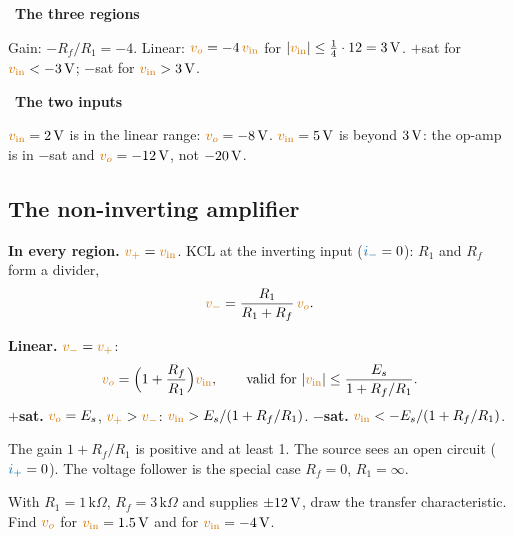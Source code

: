 \documentclass[11pt,a4paper]{article}
\newcommand{\Icol}[1]{\textcolor{ccur}{#1}}
\newcommand{\Vcol}[1]{\textcolor{cvolt}{#1}}
\newif\ifsolfirst
\newcommand{\solstep}[2]{\par\ifsolfirst\global\solfirstfalse\else\bigskip\needspace{5\baselineskip}\fi
  \noindent{\color{cpow}\bfseries Step #1.}\ {\bfseries #2}\par\nobreak\smallskip}
\newcommand{\kohm}{\,\mathrm{k}\Omega}
\newcommand{\vin}{\Vcol{v_{\mathrm{in}}}}
\newcommand{\vo}{\Vcol{v_o}}
\newcommand{\vp}{\Vcol{v_+}}
\newcommand{\vm}{\Vcol{v_-}}
\newcommand{\ip}{\Icol{i_+}}
\newcommand{\im}{\Icol{i_-}}
\newcommand{\Es}{E_s}
\newcommand{\noninvAmp}[3]{%
  \node[oa] (A) at (0,0) {};
  \draw (A.-) -- ++(-1.6,0) coordinate (n) to[R, l_=#1] ++(0,-2.5) node[ground] {};
  \draw (A.+) -- ++(-0.6,0) coordinate (s) to[american voltage source, l=#3] ($(s)+(0,-1.6)$) node[ground] {};
  \draw (n) -- ++(0,1.3) coordinate (f) to[R, l=#2] (f -| A.out) -- (A.out);
  \draw (A.out) -- ++(0.8,0) node[ocirc] {} node[right, font=\small, text=cvolt] {$v_o$};
  \fill (n) circle (1.6pt); \fill (A.out) circle (1.6pt);}
\newcommand{\tax}[6]{\draw[vax] (#1,0) -- (#2,0) node[right, font=\small] {#5};
  \draw[vax] (0,#3) -- (0,#4) node[above, font=\small] {#6};}
\newcommand{\xt}[2]{\draw ([yshift=2pt]#1,0) -- ([yshift=-2pt]#1,0) node[below, font=\scriptsize] {#2};}
\newcommand{\xtu}[2]{\draw ([yshift=2pt]#1,0) -- ([yshift=-2pt]#1,0); \node[above, font=\scriptsize] at (#1,0) {#2};}
\newcommand{\yt}[2]{\draw ([xshift=2pt]0,#1) -- ([xshift=-2pt]0,#1) node[left, font=\scriptsize] {#2};}
\newcommand{\ytr}[2]{\draw ([xshift=2pt]0,#1) -- ([xshift=-2pt]0,#1); \node[right, font=\scriptsize] at (0,#1) {#2};}
\begin{document}
\solstep{1}{The three regions}
\begin{minipage}[c]{0.52\linewidth}
Gain: $-R_f/R_1 = -4$. Linear: $\vo = -4\,\vin$ for $|\vin| \leq \frac14 \cdot 12 = 3\V$.
$+$sat for $\vin < -3\V$; $-$sat for $\vin > 3\V$.
\end{minipage}\hfill
\begin{minipage}[c]{0.44\linewidth}
\centering
{}
\end{minipage}

\solstep{2}{The two inputs}
$\vin = 2\V$ is in the linear range: $\vo = -8\V$. $\vin = 5\V$ is beyond $3\,\mathrm{V}$: the op-amp is in
$-$sat and $\vo = -12\V$, not $-20\,\mathrm{V}$.

\subsection{The non-inverting amplifier}

\begin{minipage}[c]{0.46\linewidth}
\centering
{}
\end{minipage}\hfill
\begin{minipage}[c]{0.5\linewidth}
\textbf{In every region.} $\vp = \vin$. KCL at the inverting input ($\im = 0$): $R_1$ and $R_f$
form a divider,
\[
  \vm = \frac{R_1}{R_1 + R_f}\,\vo .
\]
\end{minipage}

\textbf{Linear.} $\vm = \vp$:
\[
  \vo = \Big(1 + \frac{R_f}{R_1}\Big)\vin , \qquad \text{valid for }
  |\vin| \leq \frac{\Es}{1 + R_f/R_1} .
\]
\textbf{$+$sat.} $\vo = \Es$, $\vp > \vm$: $\vin > \Es/(1 + R_f/R_1)$. \quad
\textbf{$-$sat.} $\vin < -\Es/(1 + R_f/R_1)$.

The gain $1 + R_f/R_1$ is positive and at least 1. The source sees an open circuit
($\ip = 0$). The voltage follower is the special case $R_f = 0$, $R_1 = \infty$.

\bigskip
\begin{examplebox}
With $R_1 = 1\kohm$, $R_f = 3\kohm$ and supplies $\pm 12\,\mathrm{V}$, draw the transfer characteristic.
Find $\vo$ for $\vin = 1.5\V$ and for $\vin = -4\V$.
\end{examplebox}
\end{document}
